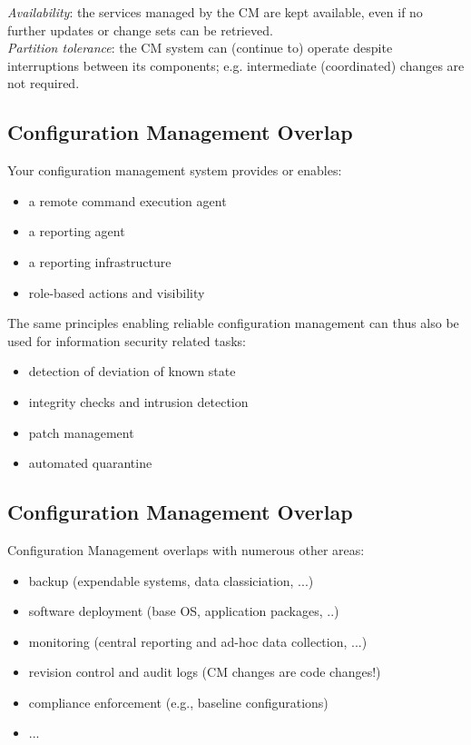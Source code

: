 \documentclass[xga]{xdvislides}
\begin{document}
{\em Availability}: the services managed by the CM are
kept available, even if no further updates or change
sets can be retrieved. \\

{\em Partition tolerance}: the CM system can (continue
to) operate despite interruptions between its
components; e.g. intermediate (coordinated) changes
are not required.

\subsection{Configuration Management Overlap}

Your configuration management system provides or
enables:

\begin{itemize}
	\item a remote command execution agent
	\item a reporting agent
	\item a reporting infrastructure
	\item role-based actions and visibility
\end{itemize}
\vspace{.5in}

The same principles enabling reliable configuration
management can thus also be used for information
security related tasks:
\begin{itemize}
	\item detection of deviation of known state
	\item integrity checks and intrusion detection
	\item patch management
	\item automated quarantine
\end{itemize}

\subsection{Configuration Management Overlap}
Configuration Management overlaps with numerous other
areas:

\begin{itemize}
	\item backup (expendable systems, data classiciation, ...)
	\item software deployment (base OS, application packages, ..)
	\item monitoring (central reporting and ad-hoc data collection, ...)
	\item revision control and audit logs (CM changes are code changes!)
	\item compliance enforcement (e.g., baseline configurations)
	\item ...
\end{itemize}
\end{document}

